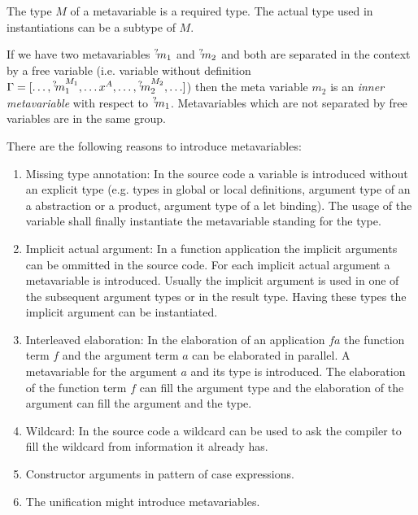 The type $M$ of a metavariable is a required type. The actual type used in
instantiations can be a subtype of $M$.

If we have two metavariables ${{}^? \kern-0.2em m}_1$ and ${{}^? \kern-0.2em m}_2$ and both are separated
in the context by a free variable (i.e. variable without definition $\Gamma = [
    \ldots, {{}^? \kern-0.2em m}_1^{M_1}, \ldots x^A, \ldots, {{}^? \kern-0.2em m}_2^{M_2}, \ldots]$) then
the meta variable $m_2$ is an \emph{inner metavariable} with respect to ${{}^? \kern-0.2em m}_1$. Metavariables which are not separated by free variables are in the same
group.

There are the following reasons to introduce metavariables:
\begin{enumerate}
    \item Missing type annotation: In the source code a variable is introduced
        without an explicit type (e.g. types in global or local definitions,
        argument type of an a abstraction or a product, argument type of a let
        binding). The usage of the variable shall finally instantiate the
        metavariable standing for the type.

    \item Implicit actual argument: In a function application the implicit
        arguments can be ommitted in the source code. For each implicit actual
        argument a metavariable is introduced. Usually the implicit argument is
        used in one of the subsequent argument types or in the result type.
        Having these types the implicit argument can be instantiated.

    \item Interleaved elaboration: In the elaboration of an application $f a$
        the function term $f$ and the argument term $a$ can be elaborated in
        parallel. A metavariable for the argument $a$ and its type is
        introduced. The elaboration of the function term $f$ can fill the
        argument type and the elaboration of the argument can fill the argument
        and the type.

    \item Wildcard: In the source code a wildcard can be used to ask the
        compiler to fill the wildcard from information it already has.

    \item Constructor arguments in pattern of case expressions.

    \item The unification might introduce metavariables.
\end{enumerate}











